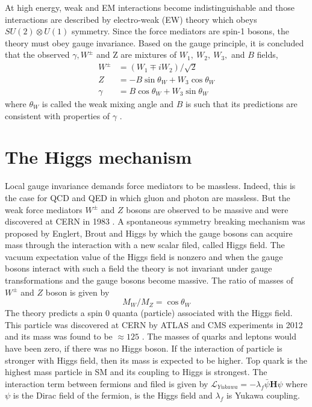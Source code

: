 At high energy, weak and EM interactions become indistinguishable and those interactions are described by electro-weak (EW) theory \cite{PhysRevLett.19.1264}\cite{Salam1959}\cite{Glashow:1959wxa} which obeys $SU(2)\otimes U(1)$ symmetry. Since the force mediators are spin-1 bosons, the theory must obey gauge invariance. Based on the gauge principle, it is concluded that the observed $\gamma, W^\pm$ and Z are mixtures of $W_1,\ W_2,\ W_3,$ and $B$ fields,
\begin{align}
W^\pm & = (W_1 \mp iW_2)/\sqrt{2}\\
Z & = -B\sin\theta_W + W_3\cos\theta_W\\
\gamma &= B\cos\theta_W + W_3\sin\theta_W
\end{align}
where $\theta_W$ is called the weak mixing angle and $B$ is such that its predictions are consistent with properties of $\gamma$ \cite{MartinShaw}.

\section{The Higgs mechanism}
Local gauge invariance demands force mediators to be massless. Indeed, this is the case for QCD and QED in which gluon and photon are massless. But the weak force mediators $W^\pm$ and $Z$ bosons are observed to be massive and were discovered at CERN in 1983 \cite{ARNISON1983103}\cite{BANNER1983476}\cite{1983398}\cite{BAGNAIA1983130}. A spontaneous symmetry breaking mechanism was proposed by Englert, Brout and Higgs \cite{Higgs:1964pj}\cite{Englert:1964et} by which the gauge bosons can acquire mass through the interaction with a new scalar filed, called Higgs field. The vacuum expectation value of the Higgs field is nonzero and when the gauge bosons interact with such a field the theory is not invariant under gauge transformations and the gauge bosons become massive. The ratio of masses of $W^\pm$ and $Z$ boson is given by
\begin{equation}
M_W/M_Z = \cos \theta_W
\end{equation}
The theory predicts a spin 0 quanta (particle) associated with the Higgs field. This particle was discovered at CERN by ATLAS and CMS experiments in 2012 \cite{Aad:2012tfa}\cite{Chatrchyan:2012xdj} and its mass was found to be $\approx 125$ \gev. The masses of quarks and leptons would have been zero, if there was no Higgs boson. If the interaction of particle is stronger with Higgs field, then its mass is expected to be higher. Top quark is the highest mass particle in SM and its coupling to Higgs is strongest. The interaction term between fermions and \higgs filed is given by $\mathcal{L}_{Yukawa} = - \lambda_f \bar{\psi}\textbf{H}\psi$ where $\psi$ is the Dirac field of the fermion, \textbf{\higgs} is the Higgs field and $\lambda_f$ is Yukawa coupling.


